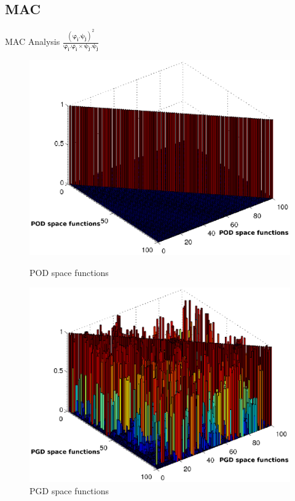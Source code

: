 \documentclass[10pt,a4paper]{beamer}
\begin{document}
\subsection{MAC}

\begin{frame}{MAC Analysis 
	$\frac{\left(\boldsymbol{\varphi_i.\psi_j}\right)^2}{\boldsymbol{\varphi_i.\varphi_i \times \psi_j.\psi_j}}$} 
	\begin{figure}
		\begin{minipage}{0.47\linewidth}
			\includegraphics[width=1\linewidth]{MAC-POD2.eps}
			\caption{\centering POD space functions}		
		\end{minipage}
		 \hspace{0.5cm}
		\begin{minipage}{0.47\linewidth}
			\includegraphics[width=1\linewidth]{MAC-PGD2.eps}
			\caption{\centering PGD space functions}		
		\end{minipage}
	\end{figure}
\end{frame}
\end{document}
